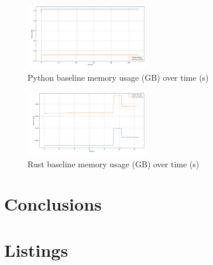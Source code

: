 \documentclass{article}
\begin{document}
\begin{multicols}{2}
\begin{figure}[H]
    \centering
    \includegraphics[width=0.48\textwidth]{figures/baseline_py.png}
    \caption{Python baseline memory usage (GB) over time (s)}
    \label{fig:baseline_py}
\end{figure}
\begin{figure}[H]
    \centering
    \includegraphics[width=0.48\textwidth]{figures/baseline_rs.png}
    \caption{Rust baseline memory usage (GB) over time (s)}
    \label{fig:baseline_rs}
\end{figure}

\section{Conclusions}
\end{multicols}
\section{Listings}





\end{document}

